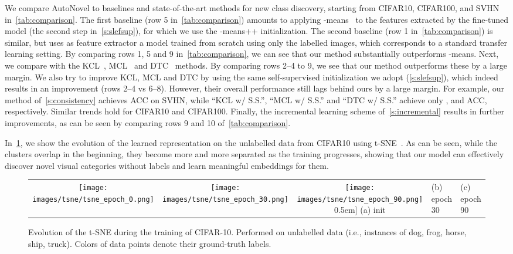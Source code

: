 We compare AutoNovel to baselines and state-of-the-art methods for new class discovery, starting from CIFAR10, CIFAR100, and SVHN in~\cref{tab:comparison}.
The first baseline (row 5 in~\cref{tab:comparison}) amounts to applying -means~\cite{MackQueen67_Kmeans} to the features extracted by the fine-tuned model (the second step in~\cref{s:slefsup}), for which we use the -means++ \cite{Arthur2008kmeanspp} initialization.
The second baseline (row 1 in~\cref{tab:comparison}) is similar, but uses as feature extractor a model  trained from scratch using only the labelled images, which corresponds to a standard transfer learning setting.
By comparing rows 1, 5 and 9 in~\cref{tab:comparison}, we can see that our method substantially outperforms -means.
Next, we compare with the KCL~\cite{Hsu18_L2C}, MCL~\cite{Hsu19_MCL} and DTC~\cite{han2019learning} methods.
By comparing rows 2--4 to 9, we see that our method outperforms these by a large margin.
We also try to improve KCL, MCL and DTC by using the same self-supervised initialization we adopt (\cref{s:slefsup}), which indeed results in an improvement (rows 2--4 vs 6--8).
However, their overall performance still lags behind ours by a large margin.
For example, our method of~\cref{s:consistency} achieves  ACC on SVHN, while ``KCL w/ S.S.'', ``MCL w/ S.S.'' and ``DTC w/ S.S.'' achieve only ,  and  ACC, respectively.
Similar trends hold for CIFAR10 and CIFAR100.
Finally, the incremental learning scheme of~\cref{s:incremental} results in further improvements, as can be seen by comparing rows 9 and 10 of~\cref{tab:comparison}.

In~\cref{fig:tsne}, we show the evolution of the learned representation on the unlabelled data from CIFAR10 using t-SNE~\cite{Maaten2008visualizing}.
As can be seen, while the clusters overlap in the beginning, they become more and more separated as the training progresses, showing that our model can effectively discover novel visual categories without labels and learn meaningful embeddings for them.

\begin{figure}[t]
\centering
\tabcolsep=0.02cm
\renewcommand{\arraystretch}{0.25}
\begin{tabular}[b]{ccc}
{\texttt{[image: images/tsne/tsne\_epoch\_0.png]}} &
{\texttt{[image: images/tsne/tsne\_epoch\_30.png]}}&
{\texttt{[image: images/tsne/tsne\_epoch\_90.png]}} \-0.5em]
(a) init & (b) epoch 30 & (c) epoch 90
\end{tabular}\hfill \caption{Evolution of the t-SNE during the training of CIFAR-10. Performed on unlabelled data (i.e., instances of dog, frog, horse, ship, truck).
Colors of data points denote their ground-truth labels.}\label{fig:tsne}
\end{figure}
 
